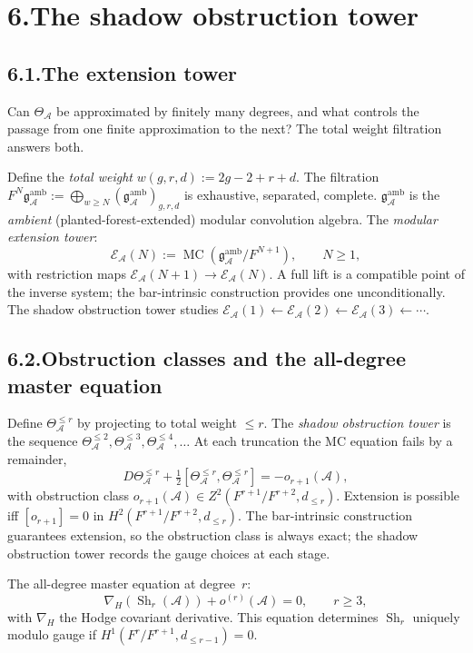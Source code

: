 \documentclass[11pt]{report}
\theoremstyle{definition}
\theoremstyle{remark}
\providecommand{\cA}{\mathcal{A}}
\providecommand{\cE}{\mathcal{E}}
\numberwithin{equation}{section}
\begin{document}
\section*{6.\quad The shadow obstruction tower}

\subsection*{6.1.\enspace The extension tower}

Can $\Theta_\cA$ be approximated by finitely many degrees, and what
controls the passage from one finite approximation to the next? The
total weight filtration answers both.

Define the \emph{total weight} $w(g,r,d):=2g-2+r+d$. The filtration
$F^N\mathfrak g^{\mathrm{amb}}_\cA:=\bigoplus_{w\ge N}(\mathfrak g^{\mathrm{amb}}_\cA)_{g,r,d}$
is exhaustive, separated, complete. $\mathfrak g^{\mathrm{amb}}_\cA$
is the \emph{ambient} (planted-forest-extended) modular convolution
algebra. The \emph{modular extension tower}:
\[
\cE_\cA(N):=\operatorname{MC}(\mathfrak g^{\mathrm{amb}}_\cA/F^{N+1}),\qquad N\ge 1,
\]
with restriction maps $\cE_\cA(N+1)\to\cE_\cA(N)$. A full lift is a
compatible point of the inverse system; the bar-intrinsic construction
provides one unconditionally. The shadow obstruction tower studies
$\cE_\cA(1)\leftarrow\cE_\cA(2)\leftarrow\cE_\cA(3)\leftarrow\cdots$.

\subsection*{6.2.\enspace Obstruction classes and the all-degree master equation}

Define $\Theta_\cA^{\le r}$ by projecting to total weight $\le r$. The
\emph{shadow obstruction tower} is the sequence
$\Theta_\cA^{\le 2},\Theta_\cA^{\le 3},\Theta_\cA^{\le 4},\ldots$ At
each truncation the MC equation fails by a remainder,
\[
D\Theta^{\le r}_\cA+\tfrac12[\Theta^{\le r}_\cA,\Theta^{\le r}_\cA]=-o_{r+1}(\cA),
\]
with obstruction class $o_{r+1}(\cA)\in Z^2(F^{r+1}/F^{r+2},d_{\le r})$.
Extension is possible iff $[o_{r+1}]=0$ in
$H^2(F^{r+1}/F^{r+2},d_{\le r})$. The bar-intrinsic construction
guarantees extension, so the obstruction class is always exact; the
shadow obstruction tower records the gauge choices at each stage.

The all-degree master equation at degree~$r$:
\[
\nabla_H(\operatorname{Sh}_r(\cA))+o^{(r)}(\cA)=0,\qquad r\ge 3,
\]
with $\nabla_H$ the Hodge covariant derivative. This equation
determines $\operatorname{Sh}_r$ uniquely modulo gauge if
$H^1(F^r/F^{r+1},d_{\le r-1})=0$.
\end{document}
